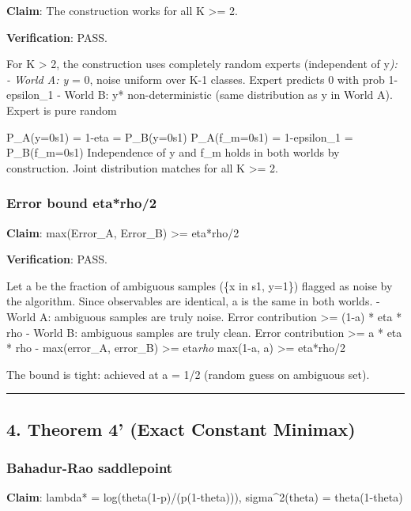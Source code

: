 \documentclass[
  12pt,
]{article}
\begin{document}
\textbf{Claim}: The construction works for all K \textgreater= 2.

\textbf{Verification}: PASS.

For K \textgreater{} 2, the construction uses completely random experts
(independent of y\emph{): - World A: y} = 0, noise uniform over K-1
classes. Expert predicts 0 with prob 1-epsilon\_1 - World B: y*
non-deterministic (same distribution as y in World A). Expert is pure
random

P\_A(y=0\textbar s1) = 1-eta = P\_B(y=0\textbar s1)
P\_A(f\_m=0\textbar s1) = 1-epsilon\_1 = P\_B(f\_m=0\textbar s1)
Independence of y and f\_m holds in both worlds by construction. Joint
distribution matches for all K \textgreater= 2.

\subsubsection{Error bound eta*rho/2}\label{error-bound-etarho2}

\textbf{Claim}: max(Error\_A, Error\_B) \textgreater= eta*rho/2

\textbf{Verification}: PASS.

Let a be the fraction of ambiguous samples (\{x in s1, y=1\}) flagged as
noise by the algorithm. Since observables are identical, a is the same
in both worlds. - World A: ambiguous samples are truly noise. Error
contribution \textgreater= (1-a) * eta * rho - World B: ambiguous
samples are truly clean. Error contribution \textgreater= a * eta * rho
- max(error\_A, error\_B) \textgreater= eta\emph{rho } max(1-a, a)
\textgreater= eta*rho/2

The bound is tight: achieved at a = 1/2 (random guess on ambiguous set).

\begin{center}\rule{0.5\linewidth}{0.5pt}\end{center}

\subsection{4. Theorem 4' (Exact Constant
Minimax)}\label{theorem-4-exact-constant-minimax}

\subsubsection{Bahadur-Rao saddlepoint}\label{bahadur-rao-saddlepoint}

\textbf{Claim}: lambda* = log(theta(1-p)/(p(1-theta))),
sigma\^{}2(theta) = theta(1-theta)
\end{document}
